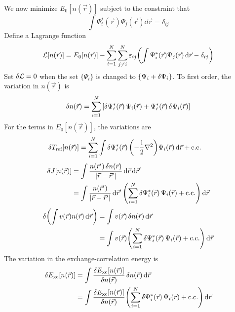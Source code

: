 \documentclass[12pt,a4paper,titlepage]{article}
\newcommand{\trm}[1]{\textrm{#1}} %
\begin{document}
We now minimize $E_{0}[n(\vec{r})]$ subject to the constraint that
\begin{equation}
\int\Psi_{i}^{*}(\vec{r})\Psi_{j}(\vec{r})\dd{\vec{r}}=\delta_{ij}
\end{equation}
Define a Lagrange function
\begin{equation}
\begin{aligned}
\mathcal{L}[n(\vec{r})]=E_{0}[n(\vec{r})]-\sum_{i=1}^{N}\sum_{j\neq i}^{N}\varepsilon_{ij}\qty(\int\Psi_{i}^{*}(\vec{r})\Psi_{j}(\vec{r})\dd{\vec{r}}-\delta_{ij})
\end{aligned}
\end{equation}
Set $\var{\mathcal{L}}=0$ when the set $\{\Psi_{i}\}$ is changed to $\{\Psi_{i}+\var{\Psi_{i}}\}$. To first order, the variation in $n(\vec{r})$ is
\begin{equation}
\var{n(\vec{r})}=\sum_{i=1}^{N}\qty[\var{\Psi_{i}^{*}(\vec{r})}\Psi_{i}(\vec{r})+\Psi_{i}^{*}(\vec{r})\var{\Psi_{i}(\vec{r})}]
\end{equation}
For the terms in $E_{0}[n(\vec{r})]$, the variations are
\begin{equation}
\var{T_{\trm{ref}}[n(\vec{r})]}=\sum_{i=1}^{N}\int\var{\Psi_{i}^{*}(\vec{r})}\qty(-\frac{1}{2}\nabla^{2})\Psi_{i}(\vec{r})\dd{\vec{r}}+\qcc*
\end{equation}
\begin{equation}
\begin{aligned}
\var{J[n(\vec{r})]}&=\int\frac{n(\vec{r}^{\prime})\var{n(\vec{r})}}{\abs{\vec{r}-\vec{r}^{\prime}}}\dd{\vec{r}}\dd{\vec{r}^{\prime}}\\
&=\int\frac{n(\vec{r}^{\prime})}{\abs{\vec{r}-\vec{r}^{\prime}}}\dd{\vec{r}^{\prime}}\qty(\sum_{i=1}^{N}\var{\Psi_{i}^{*}(\vec{r})}\Psi_{i}(\vec{r})+\trm{c.c.})\dd{\vec{r}}
\end{aligned}
\end{equation}
\begin{equation}
\begin{aligned}
\var{\qty(\int v(\vec{r})n(\vec{r})\dd{\vec{r}})}&=\int v(\vec{r})\var{n(\vec{r})}\dd{\vec{r}}\\
&=\int v(\vec{r})\qty(\sum_{i=1}^{N}\var{\Psi_{i}^{*}(\vec{r})}\Psi_{i}(\vec{r})+\trm{c.c.})\dd{\vec{r}}
\end{aligned}
\end{equation}
The variation in the exchange-correlation energy is
\begin{equation}
\begin{aligned}
\var{E_{\trm{xc}}[n(\vec{r})]}&=\int\fdv{E_{\trm{xc}}[n(\vec{r})]}{n(\vec{r})}\var{n(\vec{r})}\dd{\vec{r}}\\
&=\int\fdv{E_{\trm{xc}}[n(\vec{r})]}{n(\vec{r})}\qty(\sum_{i=1}^{N}\var{\Psi_{i}^{*}(\vec{r})}\Psi_{i}(\vec{r})+\trm{c.c.})\dd{\vec{r}}
\end{aligned}
\end{equation}
\end{document}
